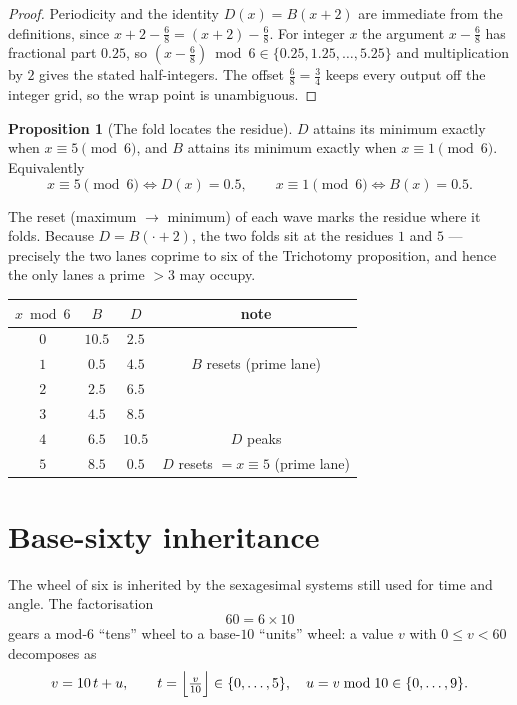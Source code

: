 \documentclass[11pt]{article}
\theoremstyle{definition}
\newtheorem{proposition}{Proposition}
\begin{document}
\begin{proof}
Periodicity and the identity $D(x)=B(x+2)$ are immediate from the definitions,
since $x+2-\tfrac68 = (x+2)-\tfrac68$. For integer $x$ the argument
$x-\tfrac68$ has fractional part $0.25$, so $(x-\tfrac68)\bmod 6 \in
\{0.25,1.25,\dots,5.25\}$ and multiplication by $2$ gives the stated
half-integers. The offset $\tfrac68=\tfrac34$ keeps every output off the
integer grid, so the wrap point is unambiguous.
\end{proof}

\begin{proposition}[The fold locates the residue]
$D$ attains its minimum exactly when $x\equiv 5\pmod 6$, and $B$ attains its
minimum exactly when $x\equiv 1\pmod 6$. Equivalently
\[
  x \equiv 5 \pmod 6 \iff D(x)=0.5, \qquad
  x \equiv 1 \pmod 6 \iff B(x)=0.5 .
\]
\end{proposition}

\noindent The reset (maximum $\to$ minimum) of each wave marks the residue where
it folds. Because $D=B(\cdot+2)$, the two folds sit at the residues $1$ and $5$
--- precisely the two lanes coprime to six of the Trichotomy proposition, and
hence the only lanes a prime $>3$ may occupy.

\begin{center}
\begin{tabular}{c c c c}
\hline
$x\bmod 6$ & $B$ & $D$ & note\\
\hline
$0$ & $10.5$ & $2.5$  & \\
$1$ & $0.5$  & $4.5$  & $B$ resets (prime lane)\\
$2$ & $2.5$  & $6.5$  & \\
$3$ & $4.5$  & $8.5$  & \\
$4$ & $6.5$  & $10.5$ & $D$ peaks\\
$5$ & $8.5$  & $0.5$  & $D$ resets $=x\equiv5$ (prime lane)\\
\hline
\end{tabular}
\end{center}

\section{Base-sixty inheritance}

The wheel of six is inherited by the sexagesimal systems still used for time and
angle. The factorisation
\[
  60 = 6 \times 10
\]
gears a mod-$6$ ``tens'' wheel to a base-$10$ ``units'' wheel: a value $v$ with
$0\le v<60$ decomposes as
\[
  v = 10\,t + u, \qquad t=\Bigl\lfloor \tfrac{v}{10}\Bigr\rfloor \in\{0,\dots,5\},
  \quad u = v \bmod 10 \in \{0,\dots,9\}.
\]
\end{document}
